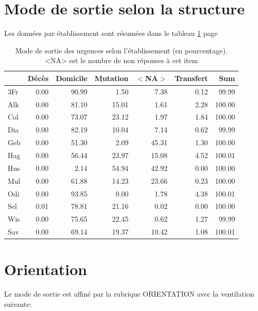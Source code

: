 \documentclass[12pt,english,french,twoside]{book}\usepackage[]{graphicx}\usepackage[]{color}
\begin{document}
\section{Mode de sortie selon la structure}

Les données par établissement sont résumées dans le tableau \ref{tab.sortie_etab} page \pageref{tab.sortie_etab}

\begin{table}[ht]
\centering
\begin{tabular}{|l|r|r|r|r|r|r|}
  \hline
 & Décès & Domicile & Mutation & $<$NA$>$ & Transfert & Sum \\ 
  \hline
3Fr & 0.00 & 90.99 & 1.50 & 7.38 & 0.12 & 99.99 \\ 
  Alk & 0.00 & 81.10 & 15.01 & 1.61 & 2.28 & 100.00 \\ 
  Col & 0.00 & 73.07 & 23.12 & 1.97 & 1.84 & 100.00 \\ 
  Dia & 0.00 & 82.19 & 10.04 & 7.14 & 0.62 & 99.99 \\ 
  Geb & 0.00 & 51.30 & 2.09 & 45.31 & 1.30 & 100.00 \\ 
  Hag & 0.00 & 56.44 & 23.97 & 15.08 & 4.52 & 100.01 \\ 
  Hus & 0.00 & 2.14 & 54.94 & 42.92 & 0.00 & 100.00 \\ 
  Mul & 0.00 & 61.88 & 14.23 & 23.66 & 0.23 & 100.00 \\ 
  Odi & 0.00 & 93.85 & 0.00 & 1.78 & 4.38 & 100.01 \\ 
  Sel & 0.01 & 78.81 & 21.16 & 0.02 & 0.00 & 100.00 \\ 
  Wis & 0.00 & 75.65 & 22.45 & 0.62 & 1.27 & 99.99 \\ 
  Sav & 0.00 & 69.14 & 19.37 & 10.42 & 1.08 & 100.01 \\ 
   \hline
\end{tabular}
\caption[Mode de sortie selon l'établissement]{Mode de sortie des urgences selon l'établissement (en pourcentage). <NA> est le nombre de non réponses à cet item} 
\label{tab.sortie_etab}
\end{table}



\section{Orientation}

Le mode de sortie est affiné par la rubrique ORIENTATION avec la ventilation suivante:
\end{document}
